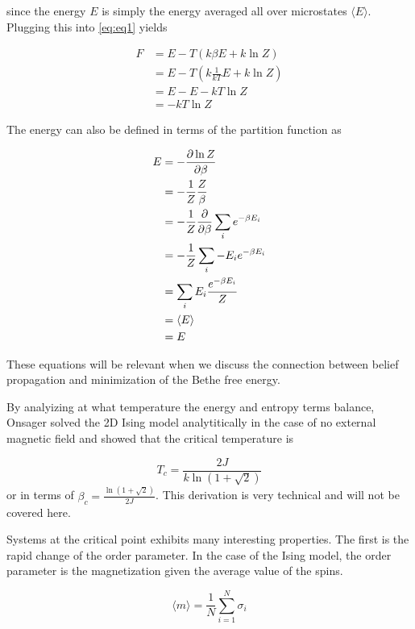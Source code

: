 \documentclass{article}
\begin{document}
since the energy $E$ is simply the energy averaged all over microstates $\langle E \rangle$. 
Plugging this into \eqref{eq:eq1} yields

\begin{align}
    F &= E - T (k \beta E + k \ln Z) \\
    &= E - T (k \frac{1}{kT} E + k \ln Z) \\
    &= E - E - kT \ln Z \\
    &= -kT \ln Z
\end{align}

The energy can also be defined in terms of the partition function as

\begin{align}
    E &= -\pdv{\ln Z}{\beta} \\
    &= -\frac{1}{Z} \frac{Z}{\beta} \\
    &= -\frac{1}{Z} \pdv{}{\beta} \sum_i e^{-\beta E_i} \\
    &= -\frac{1}{Z} \sum_i -E_i e^{-\beta E_i} \\
    &= \sum_i E_i \frac{e^{-\beta E_i}}{Z} \\
    &= \langle E \rangle \\
    &= E 
\end{align}

These equations will be relevant when we discuss the connection between belief propagation and minimization of the Bethe free energy.

By analyizing at what temperature the energy and entropy terms balance, Onsager solved the 2D Ising model analytitically in the case of no external magnetic field and showed that the critical temperature is

\begin{equation} \label{eq:eq24}
    T_c = \frac{2J}{k \ln(1 + \sqrt2)}
\end{equation}
or in terms of $\beta_c = \frac{\ln(1 + \sqrt2)}{2J}$. This derivation is very technical and will not be covered here.




Systems at the critical point exhibits many interesting properties. The first is the rapid change of the order parameter.
In the case of the Ising model, the order parameter is the magnetization given the average value of the spins.

\begin{equation}
    \langle m \rangle = \frac1N \sum_{i=1}^N \sigma_i
\end{equation}
\end{document}
